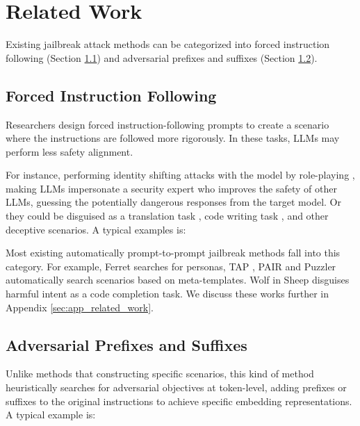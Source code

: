 \section{Related Work}
\label{sec:related-work}

Existing jailbreak attack methods can be categorized into forced instruction following (Section \ref{sec:instruction-following}) and adversarial prefixes and suffixes (Section \ref{sec:prefixes-suffixes}).

\subsection{Forced Instruction Following} \label{sec:instruction-following} 

Researchers design forced instruction-following prompts \cite{perez2022ignore, mozes2023use} to create a scenario where the instructions are followed more rigorously. In these tasks, LLMs may perform less safety alignment. 

For instance, performing identity shifting attacks with the model by role-playing \cite{bhardwaj2023red}, making LLMs impersonate a security expert who improves the safety of other LLMs, guessing the potentially dangerous responses from the target model. Or they could be disguised as a translation task \cite{qiu2023latent}, code writing task \cite{ding2023wolf}, and other deceptive scenarios. A typical examples is:


Most existing automatically prompt-to-prompt jailbreak methods fall into this category. For example, Ferret \cite{pala2024ferret} searches for personas, TAP \cite{mehrotra2023tree}, PAIR \cite{chao2023jailbreaking} and Puzzler \cite{ding2023wolf} automatically search scenarios based on meta-templates. Wolf in Sheep \cite{wei2024jailbroken} disguises harmful intent as a code completion task. We discuss these works further in Appendix \ref{sec:app_related_work}.

\subsection{Adversarial Prefixes and Suffixes} \label{sec:prefixes-suffixes}

Unlike methods that constructing specific scenarios, this kind of method heuristically searches for adversarial objectives at token-level, adding prefixes or suffixes to the original instructions to achieve specific embedding representations. A typical example is: 

